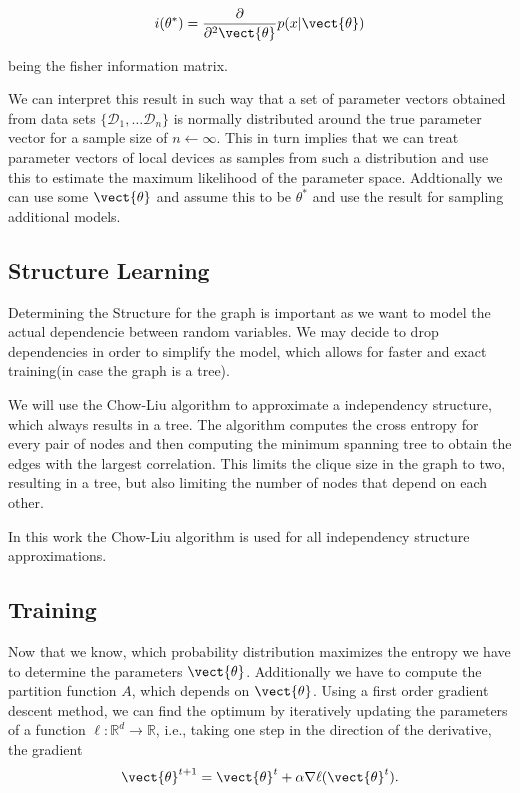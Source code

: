         \begin{equation}
            i(\theta^*) = \frac{\partial}{\partial^2 \vect{\theta}} p(x \lvert \vect{\theta})
        \end{equation}

        being the fisher information matrix.

        We can interpret this result in such way that a set of parameter vectors obtained from data sets $\{\mathcal{D}_1, \ldots \mathcal{D}_n\}$ is normally distributed around the true parameter vector for a sample size of $n \leftarrow \infty$. 
        This in turn implies that we can treat parameter vectors of local devices as samples from such a distribution and use this to estimate the maximum likelihood of the parameter space.
        Addtionally we can use some $\vect{\theta}$ and assume this to be $\theta^*$ and use the result for sampling additional models.

    \subsection{Structure Learning}
        Determining the Structure for the graph is important as we want to model the actual dependencie
        between random variables. 
        We may decide to drop dependencies in order to simplify the model, which allows for faster and exact training(in case the graph is a tree).
        
        We will use the Chow-Liu algorithm to approximate a independency structure, which always results in a tree.
        The algorithm computes the cross entropy for every pair of nodes and then computing the minimum spanning tree to 
        obtain the edges with the largest correlation.
        This limits the clique size in the graph to two, resulting in a tree, but also limiting the number of nodes that depend on each other.

        In this work the Chow-Liu algorithm is used for all independency structure approximations.


    \subsection{Training}
    \label{ssec:train}

    Now that we know, which probability distribution maximizes the entropy we have to determine the parameters $\vect{\theta}$.
    Additionally we have to compute the partition function $A$, which depends on $\vect{\theta}$.
    Using a first order gradient descent method, we can find the optimum by iteratively updating the parameters of a function $\ell: \mathbb{R}^d \rightarrow \mathbb{R}$, i.e., taking one step in the direction of the derivative, the gradient 
    \begin{equation}
        \label{eq:gradesc}
        \vect{\theta}^{t+1} = \vect{\theta}^{t} + \alpha \nabla \ell(\vect{\theta}^{t}).
    \end{equation}

